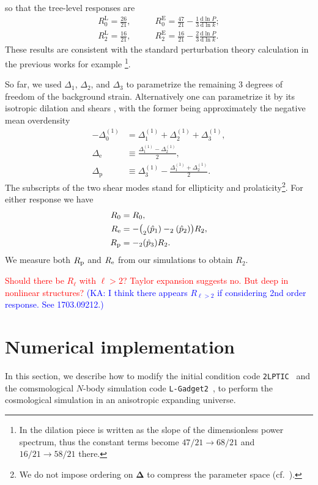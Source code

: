 \documentclass[a4paper,11pt]{article}
\let\L\relax
\DeclareMathOperator{\L}{\mathcal{L}}
\renewcommand{\d}{\mathrm{d}}
\newcommand{\vDelta}{{\bm\Delta}}
\newcommand{\Euler}{\mathrm{E}}
\newcommand{\Lagrange}{\mathrm{L}}
\newcommand{\HL}[1]{\textcolor{red}{#1}} %
\newcommand{\KA}[1]{\textcolor{Blue}{(KA: #1)}}
\begin{document}
so that the tree-level responses are
\begin{align}
    R^\Lagrange_0 = \frac{26}{21}, \qquad
    & R^\Euler_0 = \frac{47}{21} - \frac13 \frac{\d\ln P}{\d\ln k};
    \nonumber\\
    R^\Lagrange_2 = \frac{16}{21}, \qquad
    & R^\Euler_2 = \frac{16}{21} - \frac23 \frac{\d\ln P}{\d\ln k}.
\end{align}
These results are consistent with the standard perturbation theory calculation
in the previous works for example \cite{LiSchmittfullSeljak17}\footnote{In
\cite{LiSchmittfullSeljak17} the dilation piece is written as the slope of the
dimensionless power spectrum, thus the constant terms become $47/21 \to 68/21$
and $16/21 \to 58/21$ there.}.

So far, we used $\Delta_1$, $\Delta_2$, and $\Delta_3$ to parametrize the remaining 3 degrees of freedom of the
background strain.
Alternatively one can parametrize it
 by its isotropic dilation and shears \cite{BondMyers96I},
with the former being approximately the negative mean overdensity
\begin{align}
    -\Delta^{(1)}_0 &= \Delta^{(1)}_1 + \Delta^{(1)}_2 + \Delta^{(1)}_3, \nonumber\\
    \Delta_\mathrm{e} &\equiv \frac{\Delta^{(1)}_1 - \Delta^{(1)}_2}2, \nonumber\\
    \Delta_\mathrm{p} &\equiv \Delta^{(1)}_3 - \frac{\Delta^{(1)}_1 + \Delta^{(1)}_2}2.
\end{align}
The subscripts of the two shear modes stand for ellipticity and
prolaticity\footnote{We do not impose ordering on $\vDelta$ to compress the
parameter space (cf.\ \cite{BondMyers96I}).}.
For either response we have
\begin{align}
    R_0 &= R_0, \nonumber\\
    R_\mathrm{e}
    &= - \bigl(\L_2(\hat p_1) - \L_2(\hat p_2)\bigr) R_2, \nonumber\\
    R_\mathrm{p} &= - \L_2(\hat p_3) R_2.
\end{align}
We measure both $R_{\rm p}$ and $R_{\rm e}$ from our simulations to obtain $R_2$.

\HL{Should there be $R_\ell$ with $\ell>2$? Taylor expansion suggests
no. But deep in nonlinear structures?}
\KA{I think there appears $R_{\ell >2}$ if considering 2nd order response. See 1703.09212.}



\section{Numerical implementation}
\label{sec:num}
In this section, we describe how to modify the initial condition code
\texttt{2LPTIC}~\cite{Crocce_etal:2006} and
the comsmological $N$-body simulation code \texttt{L-Gadget2}~\cite{Springel05},
to perform the cosmological simulation in an anisotropic expanding universe.
\end{document}
